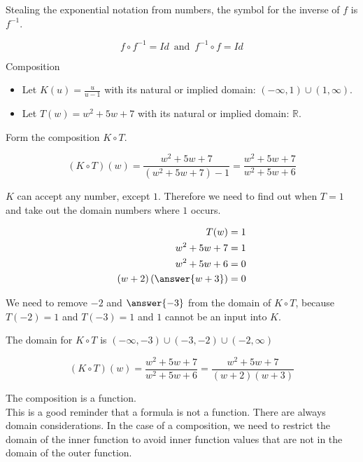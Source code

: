\documentclass{ximera}
\begin{document}
Stealing the exponential notation from numbers, the symbol for the inverse of $f$ is $f^{-1}$.

\[   f \circ f^{-1} = Id    \, \text{ and } \, f^{-1} \circ f = Id       \]










\begin{example} Composition


\begin{itemize}
\item Let $K(u) = \frac{u}{u-1}$ with its natural or implied domain: $(-\infty, 1) \cup (1, \infty)$. \\

\item Let $T(w) = w^2 + 5w + 7$ with its natural or implied domain: \textbf{$\mathbb{R}$}.
\end{itemize}


Form the composition $K \circ T$.

\[        (K \circ T)(w) =     \frac{w^2 + 5w + 7}{(w^2 + 5w + 7)-1}   =    \frac{w^2 + 5w + 7}{w^2 + 5w + 6}  \]


$K$ can accept any number, except $1$.  Therefore we need to find out when $T = 1$ and take out the domain numbers where $1$ occurs.



\begin{align*}
T(w) & = 1   \\
w^2 + 5w + 7 & = 1 \\
w^2 + 5w + 6 & = 0   \\
(w+2)\left( \answer{w+3} \right) & = 0
\end{align*}


We need to remove $-2$ and $\answer{-3}$ from the domain of $K \circ T$, because $T(-2)=1$ and $T(-3)=1$ and $1$ cannot be an input into $K$.


The domain for $K \circ T$ is $(-\infty, -3) \cup (-3, -2) \cup (-2, \infty)$




\[        (K \circ T)(w)  =    \frac{w^2 + 5w + 7}{w^2 + 5w + 6}  =    \frac{w^2 + 5w + 7}{(w+2)(w+3)} \]










The composition is a function. \\


This is a good reminder that a formula is not a function. There are always domain considerations.  In the case of a composition, we need to restrict the domain of the inner function to avoid inner function values that are not in the domain of the outer function.










\end{example}
\end{document}
